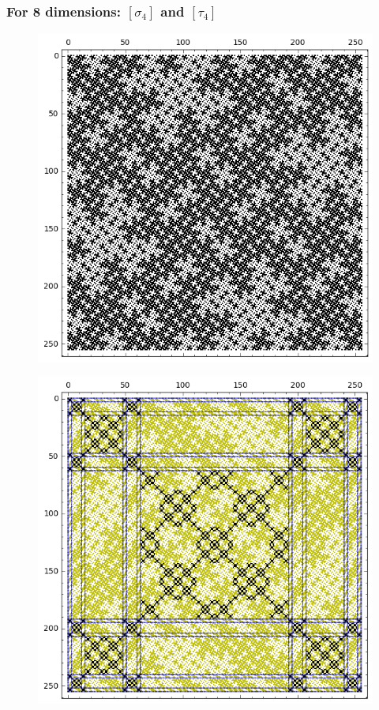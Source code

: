 \documentclass[pdf,sprung,slideColor,nocolorBG]{beamer}
\newenvironment{colortheme}[1]{
\def\ProvidesPackageRCS $##1${\relax}
\renewcommand{\ProcessOptions}{\relax}
\makeatletter

\makeatother
}{}
\begin{document}
\begin{colortheme}{jubata}
\begin{frame}
\frametitle{For 8 dimensions: $[\sigma_4]$ and $[\tau_4]$}
\begin{figure}
\centering
\begin{minipage}{.48\textwidth}
  \centering
  \includegraphics[width=.9\linewidth]{../matrix_plot/sigma_4_bent_cayley_graph_index_matrix.png}
  \label{fig:sigma_4_bent_cayley_graph_index_matrix}
\end{minipage}%
\begin{minipage}{.48\textwidth}
  \centering
  \includegraphics[width=.9\linewidth]{../matrix_plot/tau_4_bent_cayley_graph_index_matrix.png}
  \label{fig:tau_4_bent_cayley_graph_index_matrix}
\end{minipage}
\end{figure}
\end{frame}
\end{colortheme}
\end{document}
